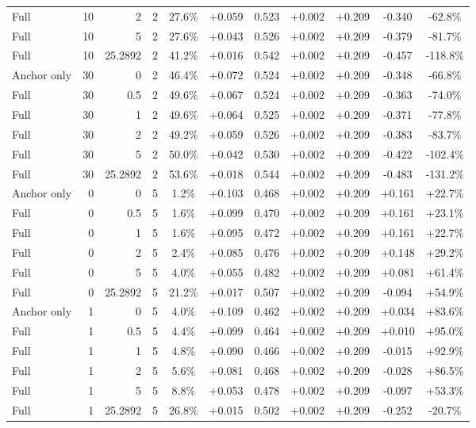 \begin{table}[htbp]
\begin{tabular}{lrrrccccccc}
Full & 10 & 2 & 2 & 27.6\% & +0.059 & 0.523 & +0.002 & +0.209 & -0.340 & -62.8\% \\
Full & 10 & 5 & 2 & 27.6\% & +0.043 & 0.526 & +0.002 & +0.209 & -0.379 & -81.7\% \\
Full & 10 & 25.2892 & 2 & 41.2\% & +0.016 & 0.542 & +0.002 & +0.209 & -0.457 & -118.8\% \\
Anchor only & 30 & 0 & 2 & 46.4\% & +0.072 & 0.524 & +0.002 & +0.209 & -0.348 & -66.8\% \\
Full & 30 & 0.5 & 2 & 49.6\% & +0.067 & 0.524 & +0.002 & +0.209 & -0.363 & -74.0\% \\
Full & 30 & 1 & 2 & 49.6\% & +0.064 & 0.525 & +0.002 & +0.209 & -0.371 & -77.8\% \\
Full & 30 & 2 & 2 & 49.2\% & +0.059 & 0.526 & +0.002 & +0.209 & -0.383 & -83.7\% \\
Full & 30 & 5 & 2 & 50.0\% & +0.042 & 0.530 & +0.002 & +0.209 & -0.422 & -102.4\% \\
Full & 30 & 25.2892 & 2 & 53.6\% & +0.018 & 0.544 & +0.002 & +0.209 & -0.483 & -131.2\% \\
Anchor only & 0 & 0 & 5 & 1.2\% & +0.103 & 0.468 & +0.002 & +0.209 & +0.161 & +22.7\% \\
Full & 0 & 0.5 & 5 & 1.6\% & +0.099 & 0.470 & +0.002 & +0.209 & +0.161 & +23.1\% \\
Full & 0 & 1 & 5 & 1.6\% & +0.095 & 0.472 & +0.002 & +0.209 & +0.161 & +22.7\% \\
Full & 0 & 2 & 5 & 2.4\% & +0.085 & 0.476 & +0.002 & +0.209 & +0.148 & +29.2\% \\
Full & 0 & 5 & 5 & 4.0\% & +0.055 & 0.482 & +0.002 & +0.209 & +0.081 & +61.4\% \\
Full & 0 & 25.2892 & 5 & 21.2\% & +0.017 & 0.507 & +0.002 & +0.209 & -0.094 & +54.9\% \\
Anchor only & 1 & 0 & 5 & 4.0\% & +0.109 & 0.462 & +0.002 & +0.209 & +0.034 & +83.6\% \\
Full & 1 & 0.5 & 5 & 4.4\% & +0.099 & 0.464 & +0.002 & +0.209 & +0.010 & +95.0\% \\
Full & 1 & 1 & 5 & 4.8\% & +0.090 & 0.466 & +0.002 & +0.209 & -0.015 & +92.9\% \\
Full & 1 & 2 & 5 & 5.6\% & +0.081 & 0.468 & +0.002 & +0.209 & -0.028 & +86.5\% \\
Full & 1 & 5 & 5 & 8.8\% & +0.053 & 0.478 & +0.002 & +0.209 & -0.097 & +53.3\% \\
Full & 1 & 25.2892 & 5 & 26.8\% & +0.015 & 0.502 & +0.002 & +0.209 & -0.252 & -20.7\% \\

\end{tabular}
\end{table}
